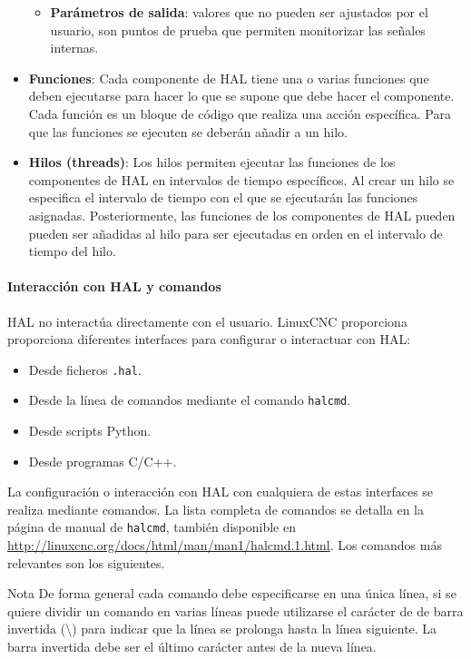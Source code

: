 \documentclass[english,spanish,a4paper,11pt]{article}
\begin{document}
\begin{itemize}
\begin{itemize}
        \item \textbf{Parámetros de salida}: valores que no pueden ser ajustados por el usuario, son puntos de prueba que permiten monitorizar las señales internas.
    \end{itemize}

    \item \textbf{Funciones}: Cada componente de \ac{HAL} tiene una o varias funciones que deben ejecutarse para hacer lo que se supone que debe hacer el componente. Cada función es un bloque de código que realiza una acción específica. Para que las funciones se ejecuten se deberán añadir a un hilo.
    
    \item \textbf{Hilos (threads)}: Los hilos permiten ejecutar las funciones de los componentes de \ac{HAL} en intervalos de tiempo específicos. Al crear un hilo se especifica el intervalo de tiempo con el que se ejecutarán las funciones asignadas. Posteriormente, las funciones de los componentes de \ac{HAL} pueden pueden ser añadidas al hilo para ser ejecutadas en orden en el intervalo de tiempo del hilo.
\end{itemize}


\paragraph{Interacción con HAL y comandos}\hfill\medskip

HAL no interactúa directamente con el usuario. LinuxCNC proporciona proporciona diferentes interfaces para configurar o interactuar con \ac{HAL}:
\begin{itemize}
    \item Desde ficheros \texttt{.hal}.
    \item Desde la línea de comandos mediante el comando \texttt{halcmd}.
    \item Desde scripts Python.
    \item Desde programas C/C++.
\end{itemize}

La configuración o interacción con \ac{HAL} con cualquiera de estas interfaces se realiza mediante comandos. La lista completa de comandos se detalla en la página de manual de \texttt{halcmd}, también disponible en \url{http://linuxcnc.org/docs/html/man/man1/halcmd.1.html}. Los comandos más relevantes son los siguientes.

\begin{admonition}{Nota}
    De forma general cada comando debe especificarse en una única línea, si se quiere dividir un comando en varias líneas puede utilizarse el carácter de de barra invertida (\textbackslash) para indicar que la línea se prolonga hasta la línea siguiente. La barra invertida debe ser el último carácter antes de la nueva línea.
\end{admonition}
\end{document}
